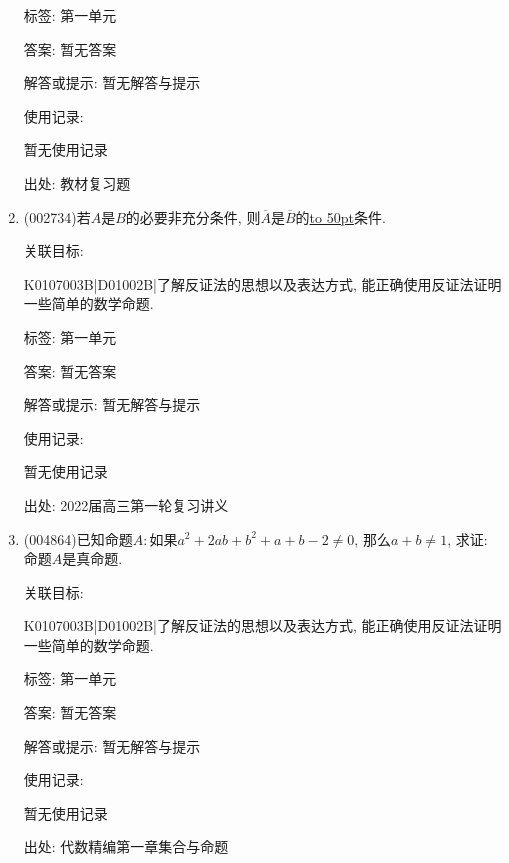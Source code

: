 \documentclass[10pt,a4paper]{article}
\newcommand{\blank}[1]{\underline{\hbox to #1pt{}}}
\begin{document}
\begin{enumerate}[1.]
标签: 第一单元

答案: 暂无答案

解答或提示: 暂无解答与提示

使用记录:

暂无使用记录


出处: 教材复习题
\item { (002734)}若$A$是$B$的必要非充分条件, 则$\overline{A}$是$\overline{B}$的\blank{50}条件.


关联目标:

K0107003B|D01002B|了解反证法的思想以及表达方式, 能正确使用反证法证明一些简单的数学命题.



标签: 第一单元

答案: 暂无答案

解答或提示: 暂无解答与提示

使用记录:

暂无使用记录


出处: 2022届高三第一轮复习讲义
\item { (004864)}已知命题$A:$如果$a^2+2ab+b^2+a+b-2\ne 0$, 那么$a+b\ne 1$, 求证: 命题$A$是真命题.


关联目标:

K0107003B|D01002B|了解反证法的思想以及表达方式, 能正确使用反证法证明一些简单的数学命题.



标签: 第一单元

答案: 暂无答案

解答或提示: 暂无解答与提示

使用记录:

暂无使用记录


出处: 代数精编第一章集合与命题
\end{enumerate}
\end{document}
